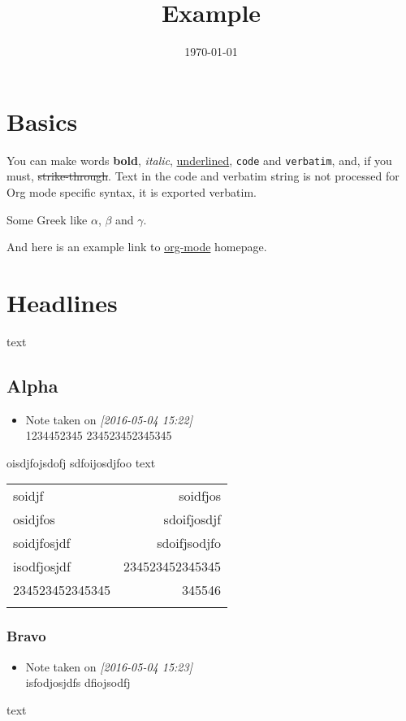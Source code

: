 \documentclass[UTF8,nofonts]{ctexart}
\date{\today}
\title{Example}
\begin{document}
\maketitle
\tableofcontents


\section{Basics}
\label{sec:orgheadline1}

You can make words \textbf{bold}, \emph{italic}, \uline{underlined}, \texttt{code} and
\texttt{verbatim}, and, if you must, \sout{strike-through}. Text in the code and
verbatim string is not processed for Org mode specific syntax, it is
exported verbatim.

Some Greek like \(\alpha\), \(\beta\) and \(\gamma\).

And here is an example link to \href{http://orgmode.org/}{org-mode} homepage.

\section{Headlines}
\label{sec:orgheadline4}

text

\subsection{Alpha}
\label{sec:orgheadline3}
\begin{itemize}
\item Note taken on \textit{[2016-05-04 15:22] } \\
1234452345
234523452345345
\end{itemize}
oisdjfojsdofj
sdfoijosdjfoo
text

\begin{center}
\begin{tabular}{lr}
soidjf & soidfjos\\
osidjfos & sdoifjosdjf\\
soidjfosjdf & sdoifjsodjfo\\
isodfjosjdf & 234523452345345\\
234523452345345 & 345546\\
 & \\
\end{tabular}
\end{center}

\subsubsection{Bravo}
\label{sec:orgheadline2}
\begin{itemize}
\item Note taken on \textit{[2016-05-04 15:23] } \\
isfodjosjdfs
dfiojsodfj
\end{itemize}
text
\end{document}
